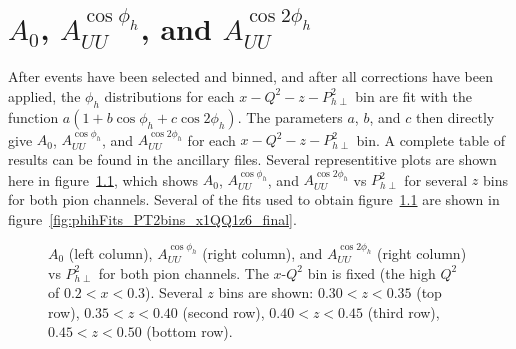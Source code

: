 \chapter{$A_0$, $A_{UU}^{\cos\phi_h}$, and $A_{UU}^{\cos 2\phi_h}$}
\label{cha:A0AcAcc}

After events have been selected and binned, and after all corrections have been applied, the $\phi_h$ distributions for each $x-Q^2-z-P_{h\perp}^2$ bin are fit with the function $a(1 + b\cos\phi_h + c\cos 2\phi_h)$.
The parameters $a$, $b$, and $c$ then directly give $A_0$, $A_{UU}^{\cos\phi_h}$, and $A_{UU}^{\cos 2\phi_h}$ for each $x-Q^2-z-P_{h\perp}^2$ bin.
A complete table of results can be found in the ancillary files.
Several representitive plots are shown here in figure~\ref{fig:A0AcAcc_zPT2bins_x1QQ1_final}, which shows $A_0$, $A_{UU}^{\cos\phi_h}$, and $A_{UU}^{\cos 2\phi_h}$ vs $P_{h\perp}^2$ for several $z$ bins for both pion channels.
Several of the fits used to obtain figure~\ref{fig:A0AcAcc_zPT2bins_x1QQ1_final} are shown in figure~\ref{fig:phihFits_PT2bins_x1QQ1z6_final}.
%
\begin{figure}[htp]
\centering
\vspace{-1.5cm}
\caption{$A_0$ (left column), $A_{UU}^{\cos\phi_h}$ (right column), and $A_{UU}^{\cos 2\phi_h}$ (right column) vs $P_{h\perp}^2$ for both pion channels. The $x$-$Q^2$ bin is fixed (the high $Q^2$ of $0.2 < x < 0.3$). Several $z$ bins are shown: $0.30 < z < 0.35$ (top row), $0.35 < z < 0.40$ (second row), $0.40 < z < 0.45$ (third row), $0.45 < z < 0.50$ (bottom row).}
\label{fig:A0AcAcc_zPT2bins_x1QQ1_final}
\end{figure}
